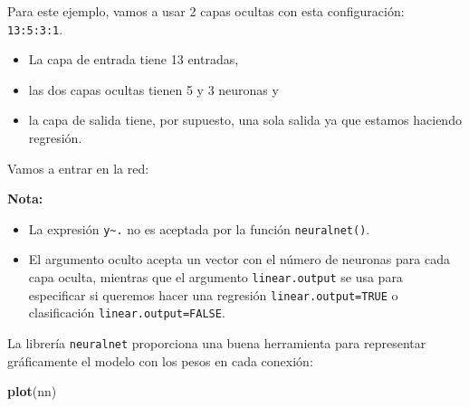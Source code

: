 \documentclass[]{book}
\newenvironment{Shaded}{\begin{snugshade}}{\end{snugshade}}
\newcommand{\KeywordTok}[1]{\textcolor[rgb]{0.13,0.29,0.53}{\textbf{#1}}}
\newcommand{\DataTypeTok}[1]{\textcolor[rgb]{0.13,0.29,0.53}{#1}}
\newcommand{\DecValTok}[1]{\textcolor[rgb]{0.00,0.00,0.81}{#1}}
\newcommand{\StringTok}[1]{\textcolor[rgb]{0.31,0.60,0.02}{#1}}
\newcommand{\OtherTok}[1]{\textcolor[rgb]{0.56,0.35,0.01}{#1}}
\newcommand{\OperatorTok}[1]{\textcolor[rgb]{0.81,0.36,0.00}{\textbf{#1}}}
\newcommand{\NormalTok}[1]{#1}
\begin{document}
Para este ejemplo, vamos a usar 2 capas ocultas con esta configuración:
\texttt{13:5:3:1}.

\begin{itemize}
\item
  La capa de entrada tiene 13 entradas,
\item
  las dos capas ocultas tienen 5 y 3 neuronas y
\item
  la capa de salida tiene, por supuesto, una sola salida ya que estamos
  haciendo regresión.
\end{itemize}

Vamos a entrar en la red:

\begin{Shaded}
\end{Shaded}

\textbf{Nota:}

\begin{itemize}
\item
  La expresión \texttt{y\textasciitilde{}.} no es aceptada por la
  función \texttt{neuralnet()}.
\item
  El argumento oculto acepta un vector con el número de neuronas para
  cada capa oculta, mientras que el argumento \texttt{linear.output} se
  usa para especificar si queremos hacer una regresión
  \texttt{linear.output=TRUE} o clasificación
  \texttt{linear.output=FALSE}.
\end{itemize}

La librería \texttt{neuralnet} proporciona una buena herramienta para
representar gráficamente el modelo con los pesos en cada conexión:

\begin{Shaded}
\begin{Highlighting}[]
\KeywordTok{plot}\NormalTok{(nn)}
\end{Highlighting}
\end{Shaded}
\end{document}
